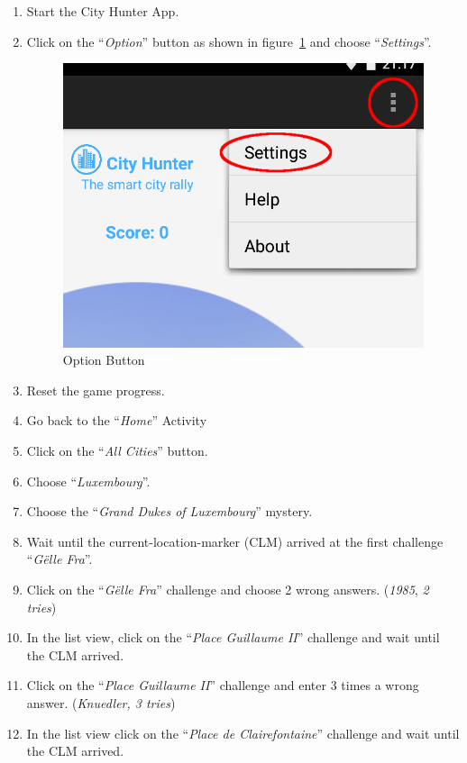 \begin{enumerate}
	\item Start the City Hunter App.
	\item Click on the ``\emph{Option}'' button as shown in figure~\ref{fig:optionButton} and choose ``\emph{Settings}''.
		\begin{figure}[H]
			\centering
			\includegraphics[scale=0.3]{Figures/SettingsButton}
			\caption{Option Button}
			\label{fig:optionButton}
		\end{figure}
	\item Reset the game progress.
	\item Go back to the ``\emph{Home}'' Activity
	\item Click on the ``\emph{All Cities}'' button.
	\item Choose ``\emph{Luxembourg}''.
	\item Choose the ``\emph{Grand Dukes of Luxembourg}'' mystery.
	\item Wait until the current-location-marker (CLM) arrived at the first challenge ``\emph{Gëlle Fra}''.
	\item Click on the ``\emph{Gëlle Fra}'' challenge and choose 2 wrong answers. (\emph{1985}, \emph{2 tries}) 
	\item In the list view, click on the ``\emph{Place Guillaume II}'' challenge and wait until the CLM arrived.
	\item Click on the ``\emph{Place Guillaume II}'' challenge and enter 3 times a wrong answer. (\emph{Knuedler, 3 tries})
	\item In the list view click on the ``\emph{Place de Clairefontaine}'' challenge and wait until the CLM arrived.

\end{enumerate}
